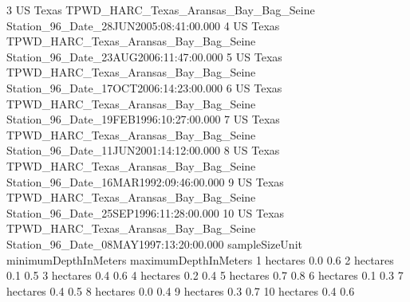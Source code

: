 \documentclass[
]{book}
\newenvironment{Shaded}{\begin{snugshade}}{\end{snugshade}}
\newcommand{\DecValTok}[1]{\textcolor[rgb]{0.00,0.00,0.81}{#1}}
\newcommand{\FloatTok}[1]{\textcolor[rgb]{0.00,0.00,0.81}{#1}}
\newcommand{\NormalTok}[1]{#1}
\newcommand{\SpecialCharTok}[1]{\textcolor[rgb]{0.00,0.00,0.00}{#1}}
\begin{document}
\begin{Shaded}
\begin{Highlighting}[]
\DecValTok{3}\NormalTok{           US         Texas TPWD\_HARC\_Texas\_Aransas\_Bay\_Bag\_Seine Station\_96\_Date\_28JUN2005}\SpecialCharTok{:}\DecValTok{08}\SpecialCharTok{:}\DecValTok{41}\SpecialCharTok{:}\FloatTok{00.000}
\DecValTok{4}\NormalTok{           US         Texas TPWD\_HARC\_Texas\_Aransas\_Bay\_Bag\_Seine Station\_96\_Date\_23AUG2006}\SpecialCharTok{:}\DecValTok{11}\SpecialCharTok{:}\DecValTok{47}\SpecialCharTok{:}\FloatTok{00.000}
\DecValTok{5}\NormalTok{           US         Texas TPWD\_HARC\_Texas\_Aransas\_Bay\_Bag\_Seine Station\_96\_Date\_17OCT2006}\SpecialCharTok{:}\DecValTok{14}\SpecialCharTok{:}\DecValTok{23}\SpecialCharTok{:}\FloatTok{00.000}
\DecValTok{6}\NormalTok{           US         Texas TPWD\_HARC\_Texas\_Aransas\_Bay\_Bag\_Seine Station\_96\_Date\_19FEB1996}\SpecialCharTok{:}\DecValTok{10}\SpecialCharTok{:}\DecValTok{27}\SpecialCharTok{:}\FloatTok{00.000}
\DecValTok{7}\NormalTok{           US         Texas TPWD\_HARC\_Texas\_Aransas\_Bay\_Bag\_Seine Station\_96\_Date\_11JUN2001}\SpecialCharTok{:}\DecValTok{14}\SpecialCharTok{:}\DecValTok{12}\SpecialCharTok{:}\FloatTok{00.000}
\DecValTok{8}\NormalTok{           US         Texas TPWD\_HARC\_Texas\_Aransas\_Bay\_Bag\_Seine Station\_96\_Date\_16MAR1992}\SpecialCharTok{:}\DecValTok{09}\SpecialCharTok{:}\DecValTok{46}\SpecialCharTok{:}\FloatTok{00.000}
\DecValTok{9}\NormalTok{           US         Texas TPWD\_HARC\_Texas\_Aransas\_Bay\_Bag\_Seine Station\_96\_Date\_25SEP1996}\SpecialCharTok{:}\DecValTok{11}\SpecialCharTok{:}\DecValTok{28}\SpecialCharTok{:}\FloatTok{00.000}
\DecValTok{10}\NormalTok{          US         Texas TPWD\_HARC\_Texas\_Aransas\_Bay\_Bag\_Seine Station\_96\_Date\_08MAY1997}\SpecialCharTok{:}\DecValTok{13}\SpecialCharTok{:}\DecValTok{20}\SpecialCharTok{:}\FloatTok{00.000}
\NormalTok{   sampleSizeUnit minimumDepthInMeters maximumDepthInMeters}
\DecValTok{1}\NormalTok{        hectares                  }\FloatTok{0.0}                  \FloatTok{0.6}
\DecValTok{2}\NormalTok{        hectares                  }\FloatTok{0.1}                  \FloatTok{0.5}
\DecValTok{3}\NormalTok{        hectares                  }\FloatTok{0.4}                  \FloatTok{0.6}
\DecValTok{4}\NormalTok{        hectares                  }\FloatTok{0.2}                  \FloatTok{0.4}
\DecValTok{5}\NormalTok{        hectares                  }\FloatTok{0.7}                  \FloatTok{0.8}
\DecValTok{6}\NormalTok{        hectares                  }\FloatTok{0.1}                  \FloatTok{0.3}
\DecValTok{7}\NormalTok{        hectares                  }\FloatTok{0.4}                  \FloatTok{0.5}
\DecValTok{8}\NormalTok{        hectares                  }\FloatTok{0.0}                  \FloatTok{0.4}
\DecValTok{9}\NormalTok{        hectares                  }\FloatTok{0.3}                  \FloatTok{0.7}
\DecValTok{10}\NormalTok{       hectares                  }\FloatTok{0.4}                  \FloatTok{0.6}
\end{Highlighting}
\end{Shaded}
\end{document}
